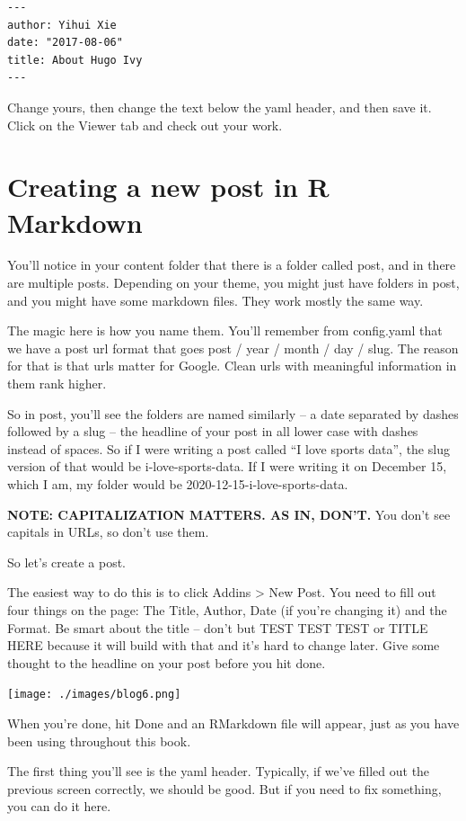 \documentclass[
  letterpaper,
  DIV=11,
  numbers=noendperiod]{scrreprt}
\begin{document}
\begin{verbatim}
---
author: Yihui Xie
date: "2017-08-06"
title: About Hugo Ivy
---
\end{verbatim}

Change yours, then change the text below the yaml header, and then save
it. Click on the Viewer tab and check out your work.

\hypertarget{creating-a-new-post-in-r-markdown}{%
\section{Creating a new post in R
Markdown}\label{creating-a-new-post-in-r-markdown}}

You'll notice in your content folder that there is a folder called post,
and in there are multiple posts. Depending on your theme, you might just
have folders in post, and you might have some markdown files. They work
mostly the same way.

The magic here is how you name them. You'll remember from config.yaml
that we have a post url format that goes post / year / month / day /
slug. The reason for that is that urls matter for Google. Clean urls
with meaningful information in them rank higher.

So in post, you'll see the folders are named similarly -- a date
separated by dashes followed by a slug -- the headline of your post in
all lower case with dashes instead of spaces. So if I were writing a
post called ``I love sports data'', the slug version of that would be
i-love-sports-data. If I were writing it on December 15, which I am, my
folder would be 2020-12-15-i-love-sports-data.

\textbf{NOTE: CAPITALIZATION MATTERS. AS IN, DON'T.} You don't see
capitals in URLs, so don't use them.

So let's create a post.

The easiest way to do this is to click Addins \textgreater{} New Post.
You need to fill out four things on the page: The Title, Author, Date
(if you're changing it) and the Format. Be smart about the title --
don't but TEST TEST TEST or TITLE HERE because it will build with that
and it's hard to change later. Give some thought to the headline on your
post before you hit done.

\texttt{[image: ./images/blog6.png]}

When you're done, hit Done and an RMarkdown file will appear, just as
you have been using throughout this book.

The first thing you'll see is the yaml header. Typically, if we've
filled out the previous screen correctly, we should be good. But if you
need to fix something, you can do it here.
\end{document}
